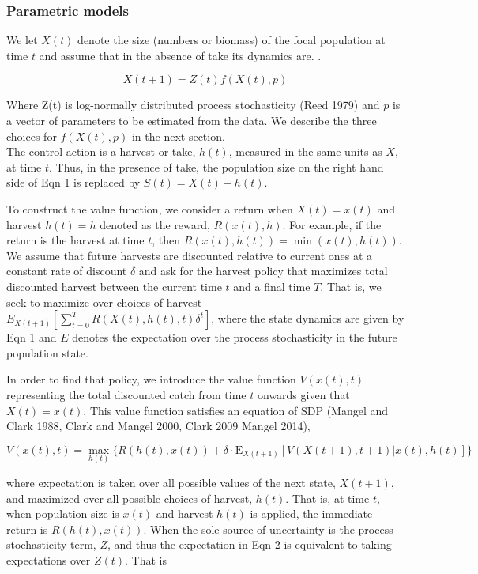 \documentclass[author-year, 12pt,review]{components/elsarticle} %
\begin{document}
\subsubsection{Parametric models}\label{parametric-models}

We let $X(t)$ denote the size (numbers or biomass) of the focal
population at time $t$ and assume that in the absence of take its
dynamics are. .

\begin{equation}
X(t+1) = Z(t) f(X(t), p) \label{eq1} 
\end{equation}

Where Z(t) is log-normally distributed process stochasticity (Reed 1979)
and $p$ is a vector of parameters to be estimated from the data. We
describe the three choices for $f(X(t),p)$ in the next section.\\The
control action is a harvest or take, $h(t)$, measured in the same units
as $X$, at time $t$. Thus, in the presence of take, the population size
on the right hand side of Eqn 1 is replaced by $S(t) = X(t) - h(t)$.

To construct the value function, we consider a return when $X(t) = x(t)$
and harvest $h(t) = h$ denoted as the reward, $R(x(t), h)$. For example,
if the return is the harvest at time $t$, then
$R(x(t), h(t)) = \min(x(t), h(t))$. We assume that future harvests are
discounted relative to current ones at a constant rate of discount
$\delta$ and ask for the harvest policy that maximizes total discounted
harvest between the current time $t$ and a final time $T$. That is, we
seek to maximize over choices of harvest
$E_{X(t+1)} [ \sum_{t = 0}^{T}  R(X(t), h(t), t) \delta^t]$, where the
state dynamics are given by Eqn 1 and $E$ denotes the expectation over
the process stochasticity in the future population state.

In order to find that policy, we introduce the value function
$V(x(t), t)$ representing the total discounted catch from time $t$
onwards given that $X(t) = x(t)$. This value function satisfies an
equation of SDP (Mangel and Clark 1988, Clark and Mangel 2000, Clark
2009 Mangel 2014),

\begin{equation}
V(x(t), t) = \max_{h(t)} \lbrace R(h(t), x(t)) + \delta \cdot \mathbf{\mathrm{E}}_{X(t+1)} \left[ V(X(t+1), t+1) | x(t), h(t) \right] \rbrace
\end{equation}

where expectation is taken over all possible values of the next state,
$X(t+1)$, and maximized over all possible choices of harvest, $h(t)$.
That is, at time $t$, when population size is $x(t)$ and harvest $h(t)$
is applied, the immediate return is $R(h(t), x(t))$. When the sole
source of uncertainty is the process stochasticity term, $Z$, and thus
the expectation in Eqn 2 is equivalent to taking expectations over
$Z(t)$. That is
\end{document}
